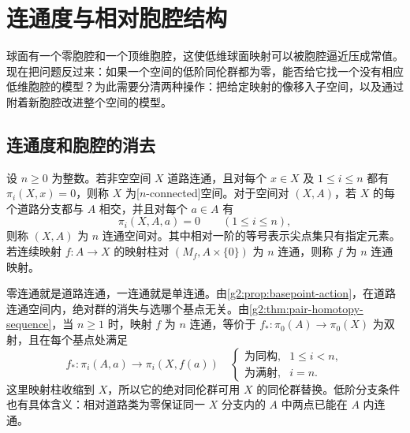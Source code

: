 
% 
% 

\section{连通度与相对胞腔结构}
\label{g2:sec:0901}

球面有一个零胞腔和一个顶维胞腔，这使低维球面映射可以被胞腔逼近压成常值。现在把问题反过来：如果一个空间的低阶同伦群都为零，能否给它找一个没有相应低维胞腔的模型？为此需要分清两种操作：把给定映射的像移入子空间，以及通过附着新胞腔改进整个空间的模型。

\subsection{连通度和胞腔的消去}
\label{g2:subsec:0901:01}

\begin{definition}[连通度]\label{g2:def:connectivity}
	设 \(n\ge0\) 为整数。若非空空间 \(X\) 道路连通，且对每个 \(x\in X\) 及 \(1\le i\le n\) 都有 \(\pi_i(X,x)=0\)，则称 \(X\) 为[\(n\)-connected]空间。对于空间对 \((X,A)\)，若 \(X\) 的每个道路分支都与 \(A\) 相交，并且对每个 \(a\in A\) 有
	\[
		\pi_i(X,A,a)=0\qquad(1\le i\le n),
	\]
	则称 \((X,A)\) 为 \(n\) 连通空间对。其中相对一阶的等号表示尖点集只有指定元素。若连续映射 \(f:A\rightarrow X\) 的映射柱对 \((M_f,A\times\{0\})\) 为 \(n\) 连通，则称 \(f\) 为 \(n\) 连通映射。
\end{definition}

零连通就是道路连通，一连通就是单连通。由\cref{g2:prop:basepoint-action}，在道路连通空间内，绝对群的消失与选哪个基点无关。由\cref{g2:thm:pair-homotopy-sequence}，当 \(n\ge1\) 时，映射 \(f\) 为 \(n\) 连通，等价于 \(f_*:\pi_0(A)\rightarrow\pi_0(X)\) 为双射，且在每个基点处满足
\[
	f_*:\pi_i(A,a)\longrightarrow\pi_i(X,f(a))
	\quad\begin{cases}
		\text{为同构},&1\le i<n,\\
		\text{为满射},&i=n.
	\end{cases}
\]
这里映射柱收缩到 \(X\)，所以它的绝对同伦群可用 \(X\) 的同伦群替换。低阶分支条件也有具体含义：相对道路类为零保证同一 \(X\) 分支内的 \(A\) 中两点已能在 \(A\) 内连通。

